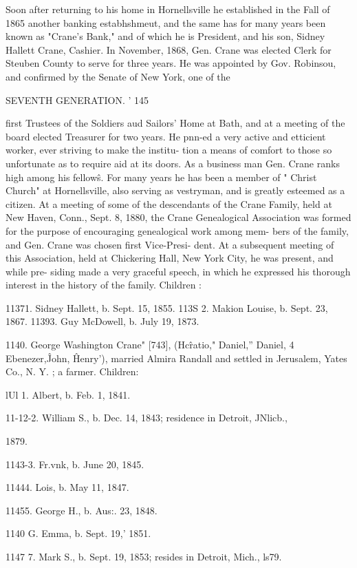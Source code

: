 Soon after returning to his home in Hornellsville he established 
in the Fall of 1865 another banking estabhshmeut, and the same 
has for many years been known as "Crane's Bank," and of 
which he is President, and his son, Sidney Hallett Crane, Cashier. 
In November, 1868, Gen. Crane was elected Clerk for Steuben 
County to serve for three years. He was appointed by Gov. 
Robinsou, and confirmed by the Senate of New York, one of the 



SEVENTH GENERATION. ' 145 

first Trustees of the Soldiers aud Sailors' Home at Bath, and at a 
meeting of the board elected Treasurer for two years. He pnn-ed 
a very active and etticient worker, ever striving to make the institu- 
tion a means of comfort to those so unfortunate as to require aid 
at its doors. As a business man Gen. Crane ranks high among 
his fellow\^s. For many years he has been a member of " Christ 
Church" at Hornellsville, also serving as vestryman, and is 
greatly esteemed as a citizen. At a meeting of some of the 
descendants of the Crane Family, held at New Haven, Conn., 
Sept. 8, 1880, the Crane Genealogical Association was formed 
for the purpose of encouraging genealogical work among mem- 
bers of the family, and Gen. Crane was chosen first Vice-Presi- 
dent. At a subsequent meeting of this Association, held at 
Chickering Hall, New York City, he was present, and while pre- 
siding made a very graceful speech, in which he expressed his 
thorough interest in the history of the family. Children : 

11371. Sidney Hallett, b. Sept. 15, 1855. 
113S 2. Makion Louise, b. Sept. 23, 1867. 
11393. Guy McDowell, b. July 19, 1873. 

1140. George Washington Crane" [743], (Hc\^ratio," Daniel,'' 
Daniel, 4 Ebenezer,\^ John, \^ Henry'), married Almira Randall and 
settled in Jerusalem, Yates Co., N. Y. ; a farmer. Children: 

lUl 1. Albert, b. Feb. 1, 1841. 

11-12-2. William S., b. Dec. 14, 1843; residence in Detroit, JNlicb., 

1879. 

1143-3. Fr.vnk, b. June 20, 1845. 

11444. Lois, b. May 11, 1847. 

11455. George H., b. Aus:. 23, 1848. 

1140 G. Emma, b. Sept. 19,' 1851. 

1147  7. Mark S., b. Sept. 19, 1853; resides in Detroit, Mich., ls79. 

